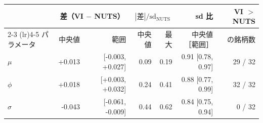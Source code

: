 \begin{tabular}{lrrrrrr}
\toprule
 & \multicolumn{2}{c}{差（VI $-$ NUTS）} & \multicolumn{2}{c}{$|\text{差}| / \mathrm{sd}_{\mathrm{NUTS}}$} & sd 比 & VI $>$ NUTS \\
\cmidrule(lr){2-3} \cmidrule(lr){4-5}
パラメータ & 中央値 & 範囲 & 中央値 & 最大 & 中央値［範囲］ & の銘柄数 \\
\midrule
$\mu$ & +0.013 & [-0.003, +0.027] & 0.09 & 0.19 & 0.91 [0.78, 0.97] & 29 / 32 \\
$\phi$ & +0.018 & [+0.003, +0.032] & 0.24 & 0.41 & 0.88 [0.77, 0.99] & 32 / 32 \\
$\sigma$ & -0.043 & [-0.061, -0.009] & 0.44 & 0.62 & 0.84 [0.75, 0.94] & 0 / 32 \\
\bottomrule
\end{tabular}
